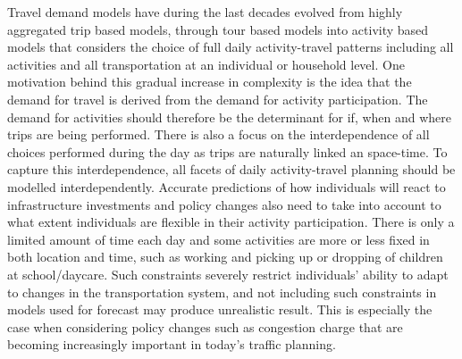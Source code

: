 

Travel demand models have during the last decades evolved from highly aggregated trip based models, through tour based models into activity based models that considers the choice of full daily activity-travel patterns including all activities and all transportation at an individual or household level. One motivation behind this gradual increase in complexity is the idea that the demand for travel is derived from the demand for activity participation. The demand for activities should therefore be the determinant for if, when and where trips are being performed. There is also a focus on the interdependence of all choices performed during the day as trips are naturally linked an space-time. To capture this interdependence, all facets of daily activity-travel planning should be modelled interdependently. Accurate predictions of how individuals will react to infrastructure investments and policy changes also need to take into account to what extent individuals are flexible in their activity participation. There is only a limited amount of time each day and some activities are more or less fixed in both location and time, such as working and picking up or dropping of children at school/daycare. Such constraints severely restrict individuals' ability to adapt to changes in the transportation system, and not including such constraints in models used for forecast may produce unrealistic result. This is especially the case when considering policy changes such as congestion charge that are becoming increasingly important in today's traffic planning. 

